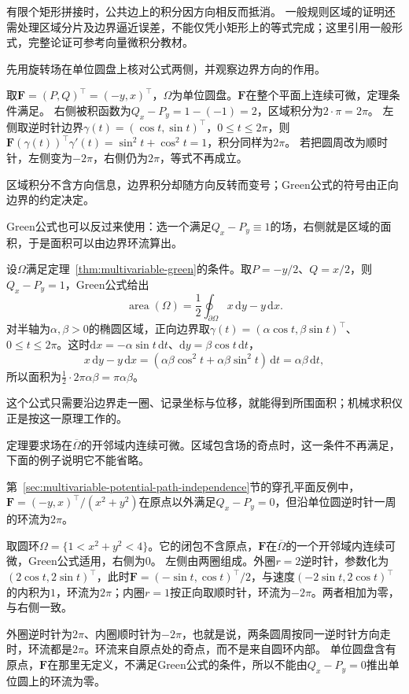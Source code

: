 有限个矩形拼接时，公共边上的积分因方向相反而抵消。
一般规则区域的证明还需处理区域分片及边界逼近误差，不能仅凭小矩形上的等式完成；这里引用一般形式，完整论证可参考向量微积分教材。

先用旋转场在单位圆盘上核对公式两侧，并观察边界方向的作用。
\begin{example}[旋转场在单位圆盘上的Green公式]
\label{ex:analysis-rotation-field-green-disk}
取$\bm F=(P,Q)^\top=(-y,x)^\top$，$\Omega$为单位圆盘。$\bm F$在整个平面上连续可微，定理条件满足。
右侧被积函数为$Q_x-P_y=1-(-1)=2$，区域积分为$2\cdot\pi=2\pi$。
左侧取逆时针边界$\gamma(t)=(\cos t,\sin t)^\top$，$0\leq t\leq2\pi$，则$\bm F(\gamma(t))^\top\gamma'(t)=\sin^2t+\cos^2t=1$，积分同样为$2\pi$。
若把圆周改为顺时针，左侧变为$-2\pi$，右侧仍为$2\pi$，等式不再成立。
\end{example}
区域积分不含方向信息，边界积分却随方向反转而变号；Green公式的符号由正向边界的约定决定。

Green公式也可以反过来使用：选一个满足$Q_x-P_y\equiv1$的场，右侧就是区域的面积，于是面积可以由边界环流算出。
\begin{example}[用边界计算面积]
\label{ex:analysis-green-area-formula}
设$\Omega$满足定理~\ref{thm:multivariable-green}的条件。取$P=-y/2$、$Q=x/2$，则$Q_x-P_y=1$，Green公式给出
\[
 \operatorname{area}(\Omega)=\frac12\oint_{\partial\Omega}x\,\mathrm dy-y\,\mathrm dx.
\]
对半轴为$\alpha,\beta>0$的椭圆区域，正向边界取$\gamma(t)=(\alpha\cos t,\beta\sin t)^\top$、$0\leq t\leq2\pi$。这时$\mathrm dx=-\alpha\sin t\,\mathrm dt$、$\mathrm dy=\beta\cos t\,\mathrm dt$，
\[
 x\,\mathrm dy-y\,\mathrm dx=(\alpha\beta\cos^2t+\alpha\beta\sin^2t)\,\mathrm dt=\alpha\beta\,\mathrm dt,
\]
所以面积为$\frac12\cdot2\pi\alpha\beta=\pi\alpha\beta$。
\end{example}
这个公式只需要沿边界走一圈、记录坐标与位移，就能得到所围面积；机械求积仪正是按这一原理工作的。

定理要求场在$\overline\Omega$的开邻域内连续可微。区域包含场的奇点时，这一条件不再满足，下面的例子说明它不能省略。
\begin{example}[有孔区域上的涡旋场]
\label{ex:analysis-annulus-vortex-green}
第~\ref{sec:multivariable-potential-path-independence}节的穿孔平面反例中，$\bm F=(-y,x)^\top/(x^2+y^2)$在原点以外满足$Q_x-P_y=0$，但沿单位圆逆时针一周的环流为$2\pi$。

取圆环$\Omega=\{1<x^2+y^2<4\}$。它的闭包不含原点，$\bm F$在$\overline\Omega$的一个开邻域内连续可微，Green公式适用，右侧为$0$。
左侧由两圈组成。外圈$r=2$逆时针，参数化为$(2\cos t,2\sin t)^\top$，此时$\bm F=(-\sin t,\cos t)^\top/2$，与速度$(-2\sin t,2\cos t)^\top$的内积为$1$，环流为$2\pi$；内圈$r=1$按正向取顺时针，环流为$-2\pi$。两者相加为零，与右侧一致。
\end{example}
外圈逆时针为$2\pi$、内圈顺时针为$-2\pi$，也就是说，两条圆周按同一逆时针方向走时，环流都是$2\pi$。环流来自原点处的奇点，而不是来自圆环内部。
单位圆盘含有原点，$\bm F$在那里无定义，不满足Green公式的条件，所以不能由$Q_x-P_y=0$推出单位圆上的环流为零。

